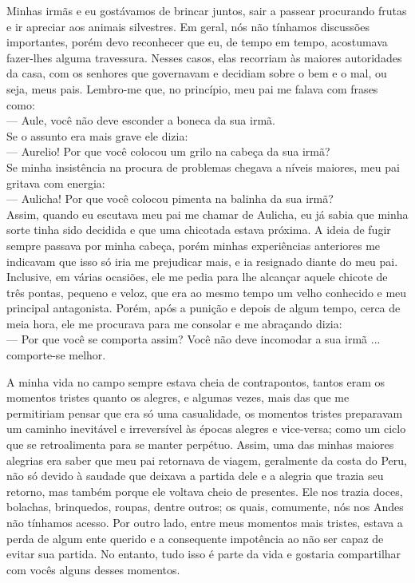 Minhas irmãs e eu gostávamos de brincar juntos, sair a passear procurando frutas e ir apreciar aos animais silvestres. Em geral, nós não tínhamos discussões importantes, porém devo reconhecer que eu, de tempo em tempo, acostumava fazer-lhes alguma travessura.
Nesses casos, elas recorriam às maiores autoridades da casa, com os senhores que governavam e decidiam sobre o bem e o mal, ou seja, meus pais. 
Lembro-me que, no princípio, meu pai me falava com frases como:\\\indent
--- Aule, você não deve esconder a boneca da sua irmã.\\\indent
Se o assunto era mais grave ele dizia: \\\indent
--- Aurelio! Por que você colocou um grilo na cabeça da sua irmã?\\\indent
Se minha insistência na procura de problemas chegava a níveis maiores, meu pai gritava com energia:\\\indent
--- Aulicha! Por que você colocou pimenta na balinha da sua irmã?\\\indent
Assim, quando eu escutava meu pai me chamar de Aulicha, eu já sabia que minha sorte tinha sido decidida e que uma chicotada estava próxima. A ideia de fugir sempre passava por minha cabeça, porém minhas experiências anteriores me indicavam que isso só iria me prejudicar mais, e ia resignado diante do meu pai. Inclusive, em várias ocasiões, ele me pedia para lhe alcançar aquele chicote de três pontas, pequeno e veloz, que era ao mesmo tempo um velho conhecido e meu principal antagonista.
Porém, após a punição e depois de algum tempo, cerca de meia hora,
ele me procurava para me consolar e me abraçando dizia:\\\indent
--- Por que você se comporta assim? Você não deve incomodar a sua irmã ... comporte-se melhor.


A minha vida no campo sempre estava cheia de contrapontos, tantos eram os momentos tristes quanto os alegres, e algumas vezes, mais das que me permitiriam pensar que era só uma casualidade, os momentos tristes preparavam um caminho inevitável e irreversível às épocas alegres e vice-versa; como um ciclo que se retroalimenta para se manter perpétuo. 
Assim, uma das minhas maiores alegrias era saber que meu pai retornava de viagem, geralmente da costa do Peru, não só devido à saudade que deixava a partida dele e a alegria que trazia seu retorno, mas também porque ele voltava cheio de presentes. Ele nos trazia doces, bolachas, brinquedos, roupas, dentre outros; os quais, comumente, nós nos Andes não tínhamos acesso.
Por outro lado, entre meus momentos mais tristes, estava a perda de algum ente querido e a consequente impotência ao não ser capaz de evitar sua partida. 
No entanto, tudo isso é parte da vida e gostaria compartilhar com vocês alguns desses momentos.



